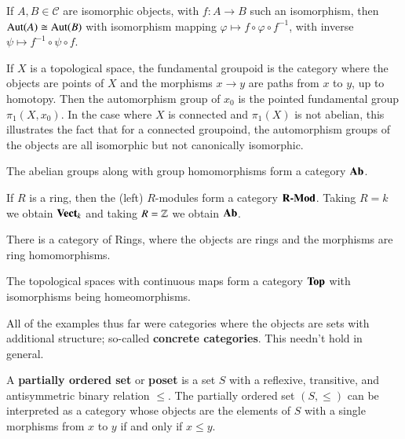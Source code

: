 \begin{remark}
    If $A,B \in \mathscr{C}$ are isomorphic objects, with $f:A\rightarrow B$ such an isomorphism, then $\operatorname{Aut}(A)\cong \operatorname{Aut}(B)$ with isomorphism mapping $\varphi\mapsto f\circ \varphi\circ f^{-1}$, with inverse $\psi\mapsto f^{-1}\circ \psi\circ f$.
\end{remark}

\begin{example}
    If $X$ is a topological space, the fundamental groupoid is the category where the objects are points of $X$ and the morphisms $x\rightarrow y$ are paths from $x$ to $y$, up to homotopy. Then the automorphism group of $x_0$ is the pointed fundamental group $\pi_1(X,x_0)$. In the case where $X$ is connected and $\pi_1(X)$ is not abelian, this illustrates the fact that for a connected groupoind, the automorphism groups of the objects are all isomorphic but not canonically isomorphic.
\end{example}

\begin{example}
    The abelian groups along with group homomorphisms form a category $\normalfont\textbf{Ab}$.
\end{example}

\begin{example}
    If $R$ is a ring, then the (left) $R$-modules form a category $\normalfont\textbf{R-Mod}$. Taking $R = k$ we obtain $\normalfont\textbf{Vect}_{k}$ and taking $R = \mathbb Z$ we obtain $\normalfont\textbf{Ab}$.
\end{example}

\begin{example}
    There is a category of Rings, where the objects are rings and the morphisms are ring homomorphisms.
\end{example}

\begin{example}
    The topological spaces with continuous maps form a category $\normalfont\textbf{Top}$ with isomorphisms being homeomorphisms.
\end{example}

All of the examples thus far were categories where the objects are sets with additional structure; so-called \textbf{concrete categories}. This needn't hold in general.

\begin{example}
    A \textbf{partially ordered set} or \textbf{poset} is a set $S$ with a reflexive, transitive, and antisymmetric binary relation $\leq$. The partially ordered set $(S,\leq)$ can be interpreted as a category whose objects are the elements of $S$ with a single morphisms from $x$ to $y$ if and only if $x \leq y$.
\end{example}

